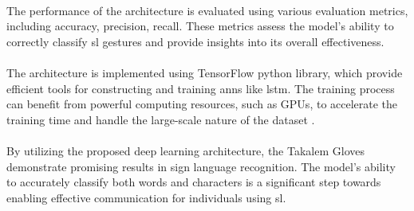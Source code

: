 \paragraph{}
The performance of the architecture is evaluated using various evaluation metrics, including accuracy, precision, recall. These metrics assess the model's ability to correctly classify \ac{sl} gestures and provide insights into its overall effectiveness.
\paragraph{}
The architecture is implemented using TensorFlow python library, which provide efficient tools for constructing and training \ac{ann}s like \ac{lstm}. The training process can benefit from powerful computing resources, such as GPUs, to accelerate the training time and handle the large-scale nature of the dataset .
\paragraph{}
By utilizing the proposed deep learning architecture, the Takalem Gloves demonstrate promising results in sign language recognition. The model's ability to accurately classify both words and characters is a significant step towards enabling effective communication for individuals using \ac{sl}.